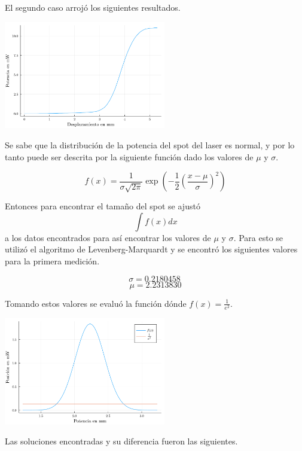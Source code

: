\documentclass[twocolumn]{article}
\begin{document}
		El segundo caso arrojó los siguientes resultados.

		\begin{center}
			\includegraphics[width=200pt]{img/measurement_2.pdf}
		\end{center}

		Se sabe que la distribución de la potencia del spot del laser es normal, y por lo tanto puede ser descrita por la siguiente función dado los valores de $\mu$ y $\sigma$.
		
		$$
		f(x) = \frac{1}{\sigma\sqrt{2\pi}}\exp({-\frac{1}{2}(\frac{x-\mu}{\sigma})^2})
		$$

		Entonces para encontrar el tamaño del spot se ajustó
		$$\int{f(x)dx}$$
		a los datos encontrados para así encontrar los valores de $\mu$ y $\sigma$. Para esto se utilizó el algoritmo de Levenberg-Marquardt y se encontró los siguientes valores para la primera medición.

		$$
		\sigma = 0.2180458 \
		$$
		$$
		\mu = 2.2313830
		$$

		Tomando estos valores se evaluó la función dónde $f(x) = \frac{1}{e^2}$.

		\begin{center}
			\includegraphics[width=200pt]{img/normal_1.pdf}
		\end{center}

		Las soluciones encontradas y su diferencia fueron las siguientes.
\end{document}
